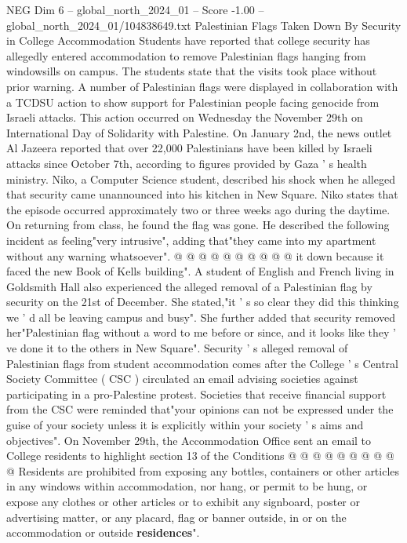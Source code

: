 \begin{textsample}{NEG Dim 6 – global\_north\_2024\_01 – Score -1.00 – global\_north\_2024\_01/104838649.txt}  \label{ex:f6_neg_366}
Palestinian Flags Taken Down By Security in College Accommodation Students have reported that college security has allegedly entered accommodation to remove Palestinian flags hanging from windowsills on campus.
The students state that the visits took place without prior warning.
A number of Palestinian flags were displayed in collaboration with a TCDSU action to show support for Palestinian people facing genocide from Israeli attacks.
This action occurred on Wednesday the November 29th on International Day of Solidarity with Palestine.
On January 2nd, the news outlet Al Jazeera reported that over 22,000 Palestinians have been killed by Israeli attacks since October 7th, according to figures provided by Gaza ' s health ministry.
Niko, a Computer Science student, described his shock when he alleged that security came unannounced into his kitchen in New Square.
Niko states that the episode occurred approximately two or three weeks ago during the daytime.
On returning from class, he found the flag was gone.
He described the following incident as feeling"very intrusive", adding that"they came into my apartment without any warning whatsoever". @ @ @ @ @ @ @ @ @ @ it down because it faced the new Book of Kells building".
A student of English and French living in Goldsmith Hall also experienced the alleged removal of a Palestinian flag by security on the 21st of December.
She stated,"it ' s so clear they did this thinking we ' d all be leaving campus and busy".
She further added that security removed her"Palestinian flag without a word to me before or since, and it looks like they ' ve done it to the others in New Square".
Security ' s alleged removal of Palestinian flags from student accommodation comes after the College ' s Central Society Committee ( CSC ) circulated an email advising societies against participating in a pro-Palestine protest.
Societies that receive financial support from the CSC were reminded that"your opinions can not be expressed under the guise of your society unless it is explicitly within your society ' s aims and objectives".
On November 29th, the Accommodation Office sent an email to College residents to highlight section 13 of the Conditions @ @ @ @ @ @ @ @ @ @ Residents are prohibited from exposing any bottles, containers or other articles in any windows within accommodation, nor hang, or permit to be hung, or expose any clothes or other articles or to exhibit any signboard, poster or advertising matter, or any placard, flag or banner outside, in or on the accommodation or outside \textbf{residences}".

\end{textsample}
